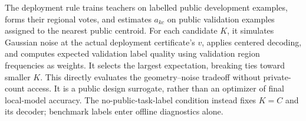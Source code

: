 The deployment rule trains teachers on labelled public development examples,
forms their regional votes, and estimates $a_{kc}$ on public validation
examples assigned to the nearest public centroid. For each candidate $K$,
it simulates Gaussian noise at the actual deployment certificate's $v$,
applies centered decoding, and computes expected validation label quality
using validation region frequencies as weights.
It selects the largest expectation, breaking ties toward smaller $K$.
This directly evaluates the geometry--noise tradeoff without private-count
access. It is a public design surrogate, rather than an optimizer of final
local-model accuracy. The no-public-task-label condition instead fixes
$K=C$ and its decoder; benchmark labels enter offline diagnostics alone.


